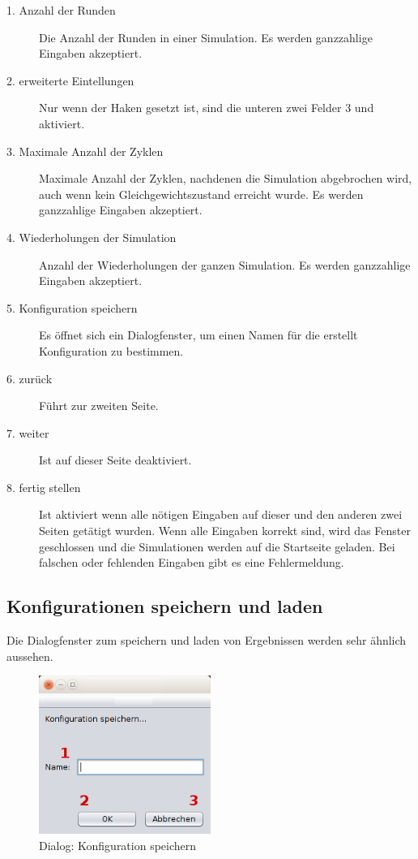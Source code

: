 \begin{description}

\item[1. Anzahl der Runden] Die Anzahl der Runden in einer Simulation. Es werden ganzzahlige Eingaben akzeptiert.

\item[2. erweiterte Eintellungen] Nur wenn der Haken gesetzt ist, sind die unteren zwei Felder 3 und  aktiviert.

\item[3. Maximale Anzahl der Zyklen] Maximale Anzahl der Zyklen, nachdenen die Simulation abgebrochen wird, auch wenn kein Gleichgewichtszustand erreicht wurde. Es werden ganzzahlige Eingaben akzeptiert.

\item[4. Wiederholungen der Simulation] Anzahl der Wiederholungen der ganzen Simulation. Es werden ganzzahlige Eingaben akzeptiert.

\item[5. Konfiguration speichern] Es öffnet sich ein Dialogfenster, um einen Namen für die erstellt Konfiguration zu bestimmen.

\item[6. zurück] Führt zur zweiten Seite.

\item[7. weiter] Ist auf dieser Seite deaktiviert.

\item[8. fertig stellen] Ist aktiviert wenn alle nötigen Eingaben auf dieser und den anderen zwei Seiten getätigt wurden. Wenn alle Eingaben korrekt sind, wird das Fenster geschlossen und die Simulationen werden auf die Startseite geladen. Bei falschen oder fehlenden Eingaben gibt es eine Fehlermeldung.

\end{description}


\subsection{Konfigurationen speichern und laden}

Die Dialogfenster zum speichern und laden von Ergebnissen werden sehr ähnlich aussehen.

\begin{figure}[hp] 
  \centering
     \includegraphics[width=0.5\textwidth]{GUI_Entwurf/KonfigSpeichern.png}
  \caption{Dialog: Konfiguration speichern}
  \label{fig:Bild5}
\end{figure}

